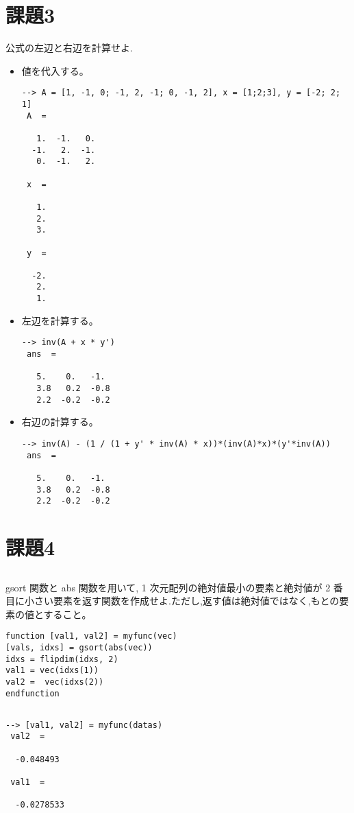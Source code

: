 \documentclass{jarticle}
\begin{document}
\section{課題3}
\label{sec:org930d7a6}
公式の左辺と右辺を計算せよ.\\
\begin{itemize}
\item 値を代入する。\\
\begin{verbatim}
--> A = [1, -1, 0; -1, 2, -1; 0, -1, 2], x = [1;2;3], y = [-2; 2; 1]
 A  = 

   1.  -1.   0.
  -1.   2.  -1.
   0.  -1.   2.

 x  = 

   1.
   2.
   3.

 y  = 

  -2.
   2.
   1.
\end{verbatim}
\item 左辺を計算する。\\
\begin{verbatim}
--> inv(A + x * y')
 ans  =

   5.    0.   -1. 
   3.8   0.2  -0.8
   2.2  -0.2  -0.2
\end{verbatim}
\item 右辺の計算する。\\
\begin{verbatim}
--> inv(A) - (1 / (1 + y' * inv(A) * x))*(inv(A)*x)*(y'*inv(A))
 ans  =

   5.    0.   -1. 
   3.8   0.2  -0.8
   2.2  -0.2  -0.2
\end{verbatim}
\end{itemize}
\section{課題4}
\label{sec:org9976032}
\subsection{}
\label{sec:org5d1b8b1}
gsort 関数と abs 関数を用いて, 1 次元配列の絶対値最小の要素と絶対値が 2 番目に小さい要素を返す関数を作成せよ.ただし,返す値は絶対値ではなく,もとの要素の値とすること。\\
\begin{verbatim}
function [val1, val2] = myfunc(vec)
[vals, idxs] = gsort(abs(vec))
idxs = flipdim(idxs, 2)
val1 = vec(idxs(1))
val2 =  vec(idxs(2))
endfunction
\end{verbatim}

\subsection{}
\label{sec:org285e2ef}
\begin{verbatim}
--> [val1, val2] = myfunc(datas)
 val2  = 

  -0.048493

 val1  = 

  -0.0278533
\end{verbatim}
\end{document}

